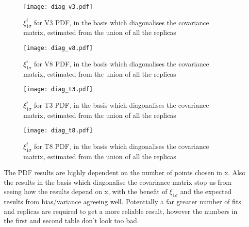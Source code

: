 \begin{figure}
    \centering
    \texttt{[image: diag\_v3.pdf]}
    \caption{
        $\xi^{i}_{1\sigma}$ for V3 PDF, in the basis which diagonalises
        the covariance matrix, estimated from the union of all the replicas
    }
    \label{fig:pdfdiagv3}
\end{figure}

\begin{figure}
    \centering
    \texttt{[image: diag\_v8.pdf]}
    \caption{
        $\xi^{i}_{1\sigma}$ for V8 PDF, in the basis which diagonalises
        the covariance matrix, estimated from the union of all the replicas
    }
    \label{fig:pdfdiagv8}
\end{figure}

\begin{figure}
    \centering
    \texttt{[image: diag\_t3.pdf]}
    \caption{
        $\xi^{i}_{1\sigma}$ for T3 PDF, in the basis which diagonalises
        the covariance matrix, estimated from the union of all the replicas
    }
    \label{fig:pdfdiagt3}
\end{figure}

\begin{figure}
    \centering
    \texttt{[image: diag\_t8.pdf]}
    \caption{
        $\xi^{i}_{1\sigma}$ for T8 PDF, in the basis which diagonalises
        the covariance matrix, estimated from the union of all the replicas
    }
    \label{fig:pdfdiagt8}
\end{figure}

The PDF results are highly dependent on the number of points chosen in x. Also
the results in the basis which diagonalise the covariance matrix stop us from
seeing how the results depend on x, with the benefit of $\xi_{1\sigma}$ and
the expected results from bias/variance agreeing well. Potentially a far greater
number of fits and replicas are required to get a more reliable result, however
the numbers in the first and second table don't look too bad.
